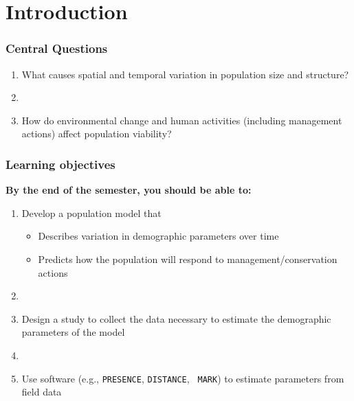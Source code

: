 \documentclass[color=usenames,dvipsnames]{beamer}
\begin{document}





\section{Introduction}


\begin{frame}
\frametitle{Central Questions}
  \large \centering
  \begin{enumerate}[\bf (1)]
    \item What causes spatial and temporal variation in population size
    and structure? \par
    \item[]
    \item<2-> How do environmental change and human activities (including
      management actions) affect population viability?
  \end{enumerate}
\end{frame}



\begin{frame}
  \frametitle{Learning objectives}
  \large
  {\bf By the end of the semester, you should be able to: \\}
  \vspace{0.3cm}
  \begin{enumerate}[\bf (1)]
    \large
    \item<1-> Develop a population model that
      \begin{itemize}
        \normalsize %
        \item Describes variation in demographic parameters over time
        \item Predicts how the population will respond to
          management/conservation actions
      \end{itemize}
    \item[]
    \item<2-> Design a study to collect the data necessary to estimate
      the demographic parameters of the model
    \item[]
    \item<3-> Use software (e.g., {\tt PRESENCE}, {\tt DISTANCE}, {\tt
        MARK}) to estimate parameters from field data
  \end{enumerate}
\end{frame}
\end{document}
